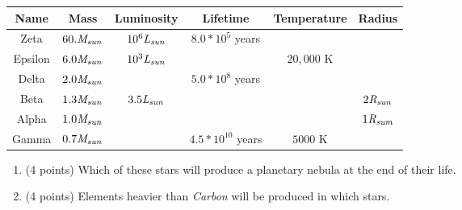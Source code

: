 \documentclass[12pt]{article}
\begin{document}
\begin{enumerate}
\begin{tabular}{|c|c|c|c|c|c|}
\hline
 Name & Mass & Luminosity & Lifetime & Temperature & Radius \\ 
\hline
 Zeta & $60. {\it M_{sun}}$ & $10^6 {\it L_{sun}}$ &  $8.0*10^5$ years & & \\ 
 \hline
Epsilon & $6.0 {\it M_{sun}}$ & $10^3 {\it L_{sun}}$ & & $20,000$ K& \\
\hline
Delta & $2.0 {\it M_{sun}}$ &  &  $5.0*10^8$ years & & \\
\hline
Beta & $1.3 {\it M_{sun}}$ & $3.5 {\it L_{sun}}$ &  & & $2 {\it R_{sun}}$ \\
\hline
Alpha & $1.0 {\it M_{sun}}$ &  &   & & $1 {\it R_{sum}} $\\
\hline
Gamma & $0.7 {\it M_{sun}}$ &  &  $4.5*10^10$ years & $5000$ K& \\
\hline
\end{tabular}


\begin{enumerate}
\item(4 points) Which of these stars will produce a planetary nebula at the end of their life.\\

\vskip 0.15in

\item (4 points) Elements heavier than {\it Carbon} will be produced in which stars.
\end{enumerate}



\end{enumerate}
\end{document}
